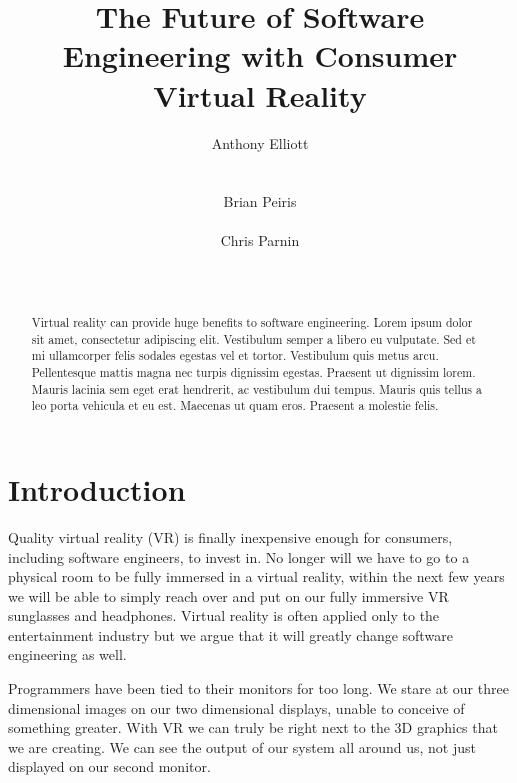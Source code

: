 \documentclass{acm_proc_article-sp}
\begin{document}
\title{The Future of Software Engineering with Consumer Virtual Reality}

\author{
\alignauthor
Anthony Elliott\\
       \\
       \\
\alignauthor
Brian Peiris\\
       \\
\alignauthor
Chris Parnin\\
       \\
       \\
}

\maketitle
\begin{abstract}
Virtual reality can provide huge benefits to software engineering.
Lorem ipsum dolor sit amet, consectetur adipiscing elit. Vestibulum semper a libero eu vulputate. Sed et mi ullamcorper felis sodales egestas vel et tortor. Vestibulum quis metus arcu. Pellentesque mattis magna nec turpis dignissim egestas. Praesent ut dignissim lorem. Mauris lacinia sem eget erat hendrerit, ac vestibulum dui tempus. Mauris quis tellus a leo porta vehicula et eu est. Maecenas ut quam eros. Praesent a molestie felis.
\end{abstract}

\section{Introduction}
Quality virtual reality (VR) is finally inexpensive enough for consumers, including software engineers, to invest in. No longer will we have to go to a physical room to be fully immersed in a virtual reality, within the next few years we will be able to simply reach over and put on our fully immersive VR sunglasses and headphones. Virtual reality is often applied only to the entertainment industry but we argue that it will greatly change software engineering as well. 

Programmers have been tied to their monitors for too long. We stare at our three dimensional images on our two dimensional displays, unable to conceive of something greater. With VR we can truly be right next to the 3D graphics that we are creating. We can see the output of our system all around us, not just displayed on our second monitor.
\end{document}
